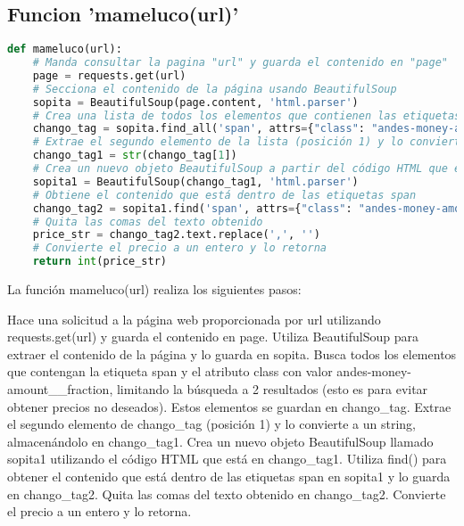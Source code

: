 \documentclass[12pt]{article}
\begin{document}
\subsection{Funcion 'mameluco(url)'}	
\begin{lstlisting}[language=Python]
def mameluco(url):
	# Manda consultar la pagina "url" y guarda el contenido en "page"
	page = requests.get(url)
	# Secciona el contenido de la página usando BeautifulSoup
	sopita = BeautifulSoup(page.content, 'html.parser')	
	# Crea una lista de todos los elementos que contienen las etiquetas "span" y el atributo "class":"andes-money-amount__fraction" con un límite de lista de 2 (limit=2)
	chango_tag = sopita.find_all('span', attrs={"class": "andes-money-amount__fraction"}, limit=2)
	# Extrae el segundo elemento de la lista (posición 1) y lo convierte a string
	chango_tag1 = str(chango_tag[1])
	# Crea un nuevo objeto BeautifulSoup a partir del código HTML que está en chango_tag1
	sopita1 = BeautifulSoup(chango_tag1, 'html.parser')
	# Obtiene el contenido que está dentro de las etiquetas span
	chango_tag2 = sopita1.find('span', attrs={"class": "andes-money-amount__fraction"})
	# Quita las comas del texto obtenido
	price_str = chango_tag2.text.replace(',', '')
	# Convierte el precio a un entero y lo retorna
	return int(price_str)		
\end{lstlisting}
La función mameluco(url) realiza los siguientes pasos:

Hace una solicitud a la página web proporcionada por url utilizando requests.get(url) y guarda el contenido en page.
Utiliza BeautifulSoup para extraer el contenido de la página y lo guarda en sopita. Busca todos los elementos que contengan la etiqueta span y el atributo class con valor andes-money-amount\_\_fraction, limitando la búsqueda a 2 resultados (esto es para evitar obtener precios no deseados). Estos elementos se guardan en chango\_tag.
Extrae el segundo elemento de chango\_tag (posición 1) y lo convierte a un string, almacenándolo en chango\_tag1.
Crea un nuevo objeto BeautifulSoup llamado sopita1 utilizando el código HTML que está en chango\_tag1.
Utiliza find() para obtener el contenido que está dentro de las etiquetas span en sopita1 y lo guarda en chango\_tag2.
Quita las comas del texto obtenido en chango\_tag2.
Convierte el precio a un entero y lo retorna.
\end{document}
